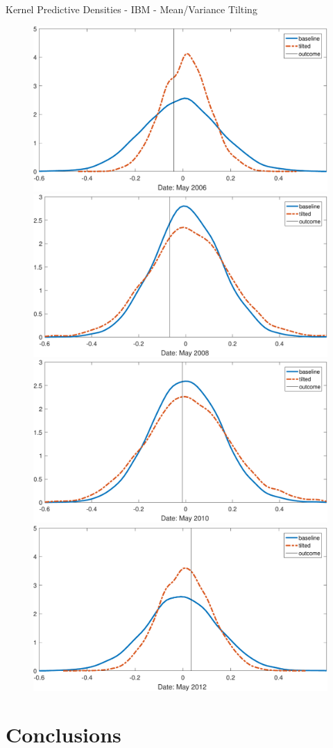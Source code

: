 \documentclass[9pt,xcolor=x11names,compress]{beamer}
\theoremstyle{standard}
\theoremstyle{notes}
\begin{document}
\begin{frame}{Kernel Predictive Densities - IBM - Mean/Variance Tilting}
	\begin{figure}
		\centering
		\includegraphics[width=0.49\linewidth]{../../Tex/plots/IBM_density_mv1}
		\includegraphics[width=0.49\linewidth]{../../Tex/plots/IBM_density_mv2}\\
		\includegraphics[width=0.49\linewidth]{../../Tex/plots/IBM_density_mv3}
		\includegraphics[width=0.49\linewidth]{../../Tex/plots/IBM_density_mv4}
		\label{fig:ibmdensplotmv}
	\end{figure}
\end{frame}

\section{Conclusions}
\end{document}
